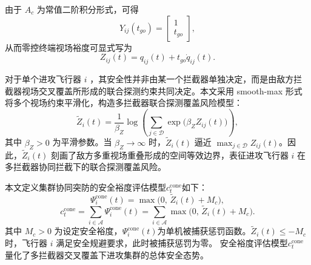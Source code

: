 由于 $A_c$ 为常值二阶积分形式，可得
\begin{equation}
Y_{ij}(t_{go})
=
\begin{bmatrix}
1\\
t_{go}
\end{bmatrix},
\end{equation}
从而零控终端视场裕度可显式写为
\begin{equation}
Z_{ij}(t)
=
q_{ij}(t)+t_{go}\dot q_{ij}(t).
\end{equation}

对于单个进攻飞行器 $i$ ，其安全性并非由某一个拦截器单独决定，而是由敌方拦截器视场交叉覆盖所形成的联合探测约束共同决定。本文采用 smooth-max 形式将多个视场约束平滑化，构造多拦截器联合探测覆盖风险模型：
\begin{equation}
\widetilde Z_i(t)
=
\frac{1}{\beta_Z}
\log\left(
\sum_{j\in\mathcal{D}}
\exp\!\bigl(\beta_Z Z_{ij}(t)\bigr)
\right),
\end{equation}
其中 $\beta_Z>0$ 为平滑参数。当 $\beta_Z\to\infty$ 时，$\widetilde Z_i(t)$ 逼近 $\max_{j\in\mathcal{D}} Z_{ij}(t)$。因此，$\widetilde Z_i(t)$ 刻画了敌方多重视场重叠形成的空间等效边界，表征进攻飞行器 $i$ 在多拦截器协同拦截下的联合探测覆盖风险。




本文定义集群协同突防的安全裕度评估模型$c_t^{\mathrm{cone}}$如下：
\begin{equation}
\Psi_i^{\mathrm{cone}}(t)
=
\max\bigl(0,\, \widetilde Z_i(t)+M_c\bigr),
\end{equation}
\begin{equation}
c_t^{\mathrm{cone}}
=
\sum_{i\in\mathcal{A}}
\Psi_i^{\mathrm{cone}}(t)
=
\sum_{i\in\mathcal{A}}
\max\bigl(0,\, \widetilde Z_i(t)+M_c\bigr).
\end{equation}
其中 $M_c>0$ 为设定安全裕度，$\Psi_i^{\mathrm{cone}}(t)$为单机被捕获惩罚函数。$\widetilde Z_i(t)\le -M_c$ 时，飞行器 $i$ 满足安全规避要求，此时被捕获惩罚为零。
安全裕度评估模型$c_t^{\mathrm{cone}}$量化了多拦截器交叉覆盖下进攻集群的总体安全态势。

